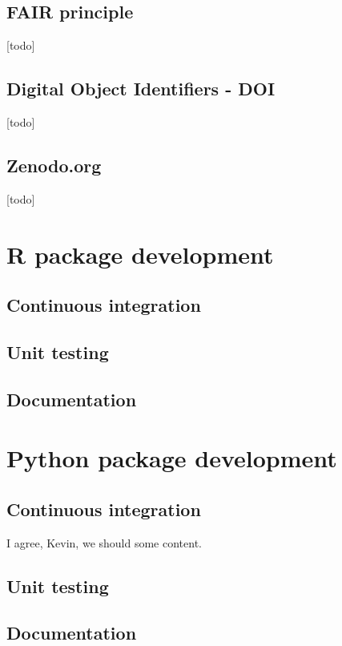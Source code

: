 \documentclass[]{book}
\begin{document}
\section{FAIR principle}\label{sct-fair}

{[}todo{]}

\section{Digital Object Identifiers - DOI}\label{sct-doi}

{[}todo{]}

\section{Zenodo.org}\label{sct-zenodo}

{[}todo{]}

\chapter{R package development}\label{r-package-development}

\section{Continuous integration}\label{continuous-integration}

\section{Unit testing}\label{unit-testing}

\section{Documentation}\label{documentation}

\chapter{Python package development}\label{python-package-development}

\section{Continuous integration}\label{continuous-integration-1}

I agree, Kevin, we should some content.

\section{Unit testing}\label{unit-testing-1}

\section{Documentation}\label{documentation-1}


\end{document}

